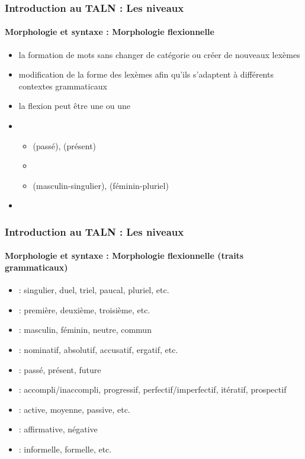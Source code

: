 \documentclass[xcolor=table]{beamer}
\begin{document}
\begin{frame}
\frametitle{Introduction au TALN : Les niveaux}
\framesubtitle{Morphologie et syntaxe : Morphologie flexionnelle}

\begin{itemize}
	\item la formation de mots sans changer de catégorie ou créer de nouveaux lexèmes 
	\item modification de la forme des lexèmes afin qu'ils s'adaptent à différents contextes grammaticaux
	\item la flexion peut être une  ou une 
	\item {}
	\begin{itemize}
		\item {}  (passé),  (présent)
		\item {}
		\item {}  (masculin-singulier),  (féminin-pluriel)
	\end{itemize}
	\item {}  
	
\end{itemize}


\end{frame}

\begin{frame}
\frametitle{Introduction au TALN : Les niveaux}
\framesubtitle{Morphologie et syntaxe : Morphologie flexionnelle (traits grammaticaux)}

\begin{itemize}
	\item {} : singulier, duel, triel, paucal, pluriel, etc. 
	\item {} : première, deuxième, troisième, etc.
	\item {} : masculin, féminin, neutre, commun 
	\item {} : nominatif, absolutif, accusatif, ergatif, etc.
	\item {} : passé, présent, future
	\item {} : accompli/inaccompli, progressif, perfectif/imperfectif, itératif, prospectif
	\item {} : active, moyenne, passive, etc.
	\item {} : affirmative, négative
	\item {} : informelle, formelle, etc.
\end{itemize}

\end{frame}
\end{document}
